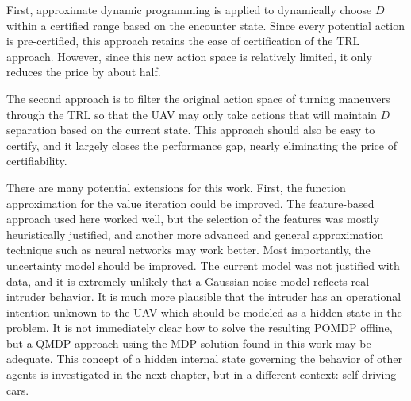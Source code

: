 First, approximate dynamic programming is applied to dynamically choose $D$ within a certified range based on the encounter state.
Since every potential action is pre-certified, this approach retains the ease of certification of the TRL approach.
However, since this new action space is relatively limited, it only reduces the price by about half.

The second approach is to filter the original action space of turning maneuvers through the TRL so that the UAV may only take actions that will maintain $D$ separation based on the current state.
This approach should also be easy to certify, and it largely closes the performance gap, nearly eliminating the price of certifiability.

There are many potential extensions for this work.
First, the function approximation for the value iteration could be improved.
The feature-based approach used here worked well, but the selection of the features was mostly heuristically justified, and another more advanced and general approximation technique such as neural networks may work better.
Most importantly, the uncertainty model should be improved.
The current model was not justified with data, and it is extremely unlikely that a Gaussian noise model reflects real intruder behavior.
It is much more plausible that the intruder has an operational intention unknown to the UAV which should be modeled as a hidden state in the problem.
It is not immediately clear how to solve the resulting POMDP offline, but a QMDP approach using the MDP solution found in this work may be adequate.
This concept of a hidden internal state governing the behavior of other agents is investigated in the next chapter, but in a different context: self-driving cars.
